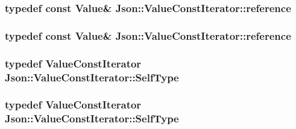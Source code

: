 \hypertarget{classJson_1_1ValueConstIterator_aa9b05c6a37cd352ea1ee6e13b816f709}{
\subsubsection[{reference}]{\setlength{\rightskip}{0pt plus 5cm}typedef const {\bf Value}\& {\bf Json\-::\-Value\-Const\-Iterator\-::reference}}}\label{d8/d4f/classJson_1_1ValueConstIterator_aa9b05c6a37cd352ea1ee6e13b816f709}
\hypertarget{classJson_1_1ValueConstIterator_aa9b05c6a37cd352ea1ee6e13b816f709}{
\subsubsection[{reference}]{\setlength{\rightskip}{0pt plus 5cm}typedef const {\bf Value}\& {\bf Json\-::\-Value\-Const\-Iterator\-::reference}}}\label{d8/d4f/classJson_1_1ValueConstIterator_aa9b05c6a37cd352ea1ee6e13b816f709}
\hypertarget{classJson_1_1ValueConstIterator_a0c2e33e7eb5a80dd8709fb28ece83933}{
\subsubsection[{Self\-Type}]{\setlength{\rightskip}{0pt plus 5cm}typedef {\bf Value\-Const\-Iterator} {\bf Json\-::\-Value\-Const\-Iterator\-::\-Self\-Type}}}\label{d8/d4f/classJson_1_1ValueConstIterator_a0c2e33e7eb5a80dd8709fb28ece83933}
\hypertarget{classJson_1_1ValueConstIterator_a0c2e33e7eb5a80dd8709fb28ece83933}{
\subsubsection[{Self\-Type}]{\setlength{\rightskip}{0pt plus 5cm}typedef {\bf Value\-Const\-Iterator} {\bf Json\-::\-Value\-Const\-Iterator\-::\-Self\-Type}}}\label{d8/d4f/classJson_1_1ValueConstIterator_a0c2e33e7eb5a80dd8709fb28ece83933}
